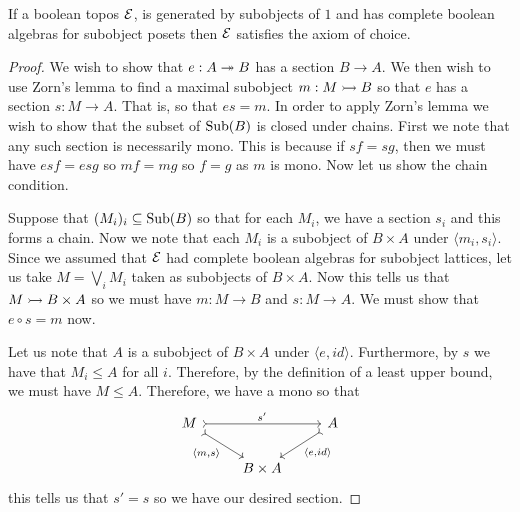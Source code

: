 \begin{lem}\label{lem:background:completealgebratoaoc}
  If a boolean topos $\mathcal{E}{}$, is generated by subobjects of $1$ and
  has complete boolean algebras for subobject posets then $\mathcal{E}{}$
  satisfies the axiom of choice.
\end{lem}
\begin{proof}
  We wish to show that $e : A \twoheadrightarrow B$ has a section $B \to A$. We then
  wish to use Zorn's lemma to find a maximal subobject $m : M \rightarrowtail B$
  so that $e$ has a section $s : M \to A$. That is, so that $es = m$.
  In order to apply Zorn's lemma we wish to show that the subset of
  $\operatorname{Sub}(B)$ is closed under chains. First we note that any such
  section is necessarily mono. This is because if $sf = sg$, then we
  must have $esf = esg$ so $mf = mg$ so $f = g$ as $m$ is mono. Now
  let us show the chain condition.

  Suppose that $(M_i)_i \subseteq \operatorname{Sub}(B)$ so that for each $M_i$, we
  have a section $s_i$ and this forms a chain. Now we note that each
  $M_i$ is a subobject of $B \times A$ under
  $\langle m_i, s_i \rangle$. Since we assumed that $\mathcal{E}{}$ had
  complete boolean algebras for subobject lattices, let us take
  $M = \bigvee_i M_i$ taken as subobjects of $B \times A$. Now this
  tells us that $M \rightarrowtail B \times A$ so we must have $m : M \to B$ and
  $s : M \to A$. We must show that $e \circ s = m$ now.

  Let us note that $A$ is a subobject of $B \times A$ under
  $\langle e, id \rangle$. Furthermore, by $s$ we have that
  $M_i \le A$ for all $i$. Therefore, by the definition of a least
  upper bound, we must have $M \le A$. Therefore, we have a mono so
  that
  \[
    \begin{tikzcd}
      M \ar[rr, rightarrowtail, "s'"] \ar[dr, swap, rightarrowtail, "{\langle m, s \rangle}"] &&
      A \ar[dl, rightarrowtail, "{\langle e, id \rangle}"]\\
      &B \times A&
    \end{tikzcd}
  \]
  this tells us that $s' = s$ so we have our desired section.


\end{proof}

